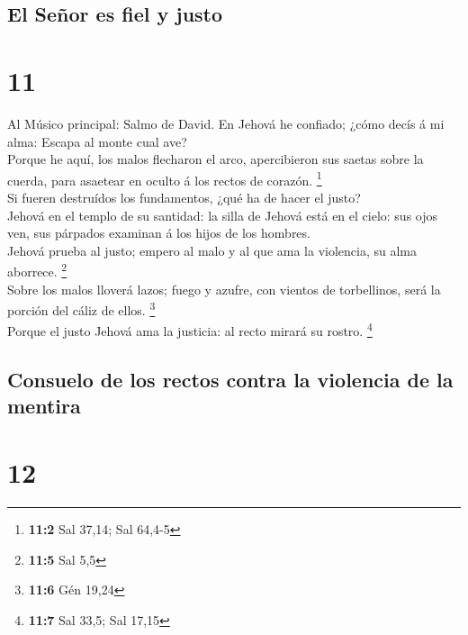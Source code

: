\hypertarget{el-seuxf1or-es-fiel-y-justo}{%
\subsection{El Señor es fiel y
justo}\label{el-seuxf1or-es-fiel-y-justo}}

\hypertarget{section-10}{%
\section{11}\label{section-10}}

 Al Músico principal: Salmo de David. En Jehová he
confiado; ¿cómo decís á mi alma: Escapa al monte cual ave?\\
 Porque he aquí, los malos flecharon el arco, apercibieron
sus saetas sobre la cuerda, para asaetear en oculto á los rectos de
corazón. \footnote{\textbf{11:2} Sal 37,14; Sal 64,4-5}\\
 Si fueren destruídos los fundamentos, ¿qué ha de hacer el
justo?\\
 Jehová en el templo de su santidad: la silla de Jehová
está en el cielo: sus ojos ven, sus párpados examinan á los hijos de los
hombres.\\
 Jehová prueba al justo; empero al malo y al que ama la
violencia, su alma aborrece. \footnote{\textbf{11:5} Sal 5,5}\\
 Sobre los malos lloverá lazos; fuego y azufre, con
vientos de torbellinos, será la porción del cáliz de ellos.
\footnote{\textbf{11:6} Gén 19,24}\\
 Porque el justo Jehová ama la justicia: al recto mirará
su rostro. \footnote{\textbf{11:7} Sal 33,5; Sal 17,15}

\hypertarget{consuelo-de-los-rectos-contra-la-violencia-de-la-mentira}{%
\subsection{Consuelo de los rectos contra la violencia de la
mentira}\label{consuelo-de-los-rectos-contra-la-violencia-de-la-mentira}}

\hypertarget{section-11}{%
\section{12}\label{section-11}}

